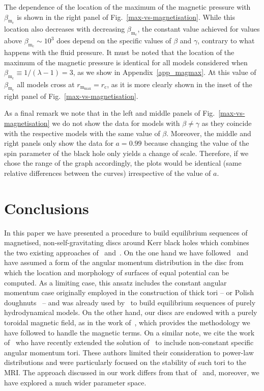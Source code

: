 \documentclass[referee]{aa}
\begin{document}
The dependence of the location of the maximum of the magnetic pressure with $\beta_{\mathrm{m}_{\mathrm{c}}}$ is shown in the right panel of Fig.~\ref{max-vs-magnetisation}. While this location also decreases with decreasing $\beta_{\mathrm{m}_{\mathrm{c}}}$, the constant value achieved for values above $\beta_{\mathrm{m}_{\mathrm{c}}}\sim 10^{3}$ does depend on the specific values of $\beta$ and $\gamma$, contrary to what happens with the fluid pressure. It must be noted that the location of the maximum of the magnetic pressure is identical for all models considered when $\beta_{\mathrm{m}_{\mathrm{c}}} \equiv 1/(\lambda - 1) = 3$, as we show in Appendix~\ref{app_magmax}. At this value of $\beta_{\mathrm{m}_{\mathrm{c}}}$ all models cross at $r_{\mathrm{m}_{\mathrm{max}}} = r_{\mathrm{c}}$, as it is more clearly shown in the inset of the right panel of Fig.~\ref{max-vs-magnetisation}.

As a final remark we note that in the left and middle panels of Fig.~\ref{max-vs-magnetisation} we do not show the data for models with $\beta \neq \gamma$ as they coincide with the respective models with the same value of $\beta$. Moreover, the middle and right panels only show the data for $a=0.99$ because changing the value of the spin parameter of the black hole only yields a change of scale. Therefore, if we chose the range of the graph accordingly, the plots would be identical (same relative differences between the curves) irrespective of the value of $a$.

\section{Conclusions}
\label{conclusions}

In this paper we have presented a procedure to build equilibrium sequences of magnetised, non-self-gravitating discs around Kerr black holes which combines the two existing approaches of~\citet{Komissarov:2006} and~\citet{Qian:2009}. On the one hand we have followed~\citet{Qian:2009} and have assumed a form of the angular momentum distribution in the disc from which the location and morphology of surfaces of equal potential can be computed. As a limiting case, this ansatz includes the constant angular momentum case originally employed in the construction of thick tori -- or Polish doughnuts~\citep{Abramowicz:1978,Kozlowski:1978}  -- and was already used by~\citet{Qian:2009} to build equilibrium sequences of purely hydrodynamical models. On the other hand, our discs are endowed with a purely toroidal magnetic field, as in the work of~\citet{Komissarov:2006}, which provides the methodology we have followed to handle the magnetic terms. On a similar note, we cite the work of~\citet{Wielgus:2015} who have recently extended the solution of~\citet{Komissarov:2006} to include non-constant specific angular momentum tori. These authors limited their consideration to power-law distributions and were particularly focused on the stability of such tori to the MRI. The approach discussed in our work differs from that of~\citet{Wielgus:2015} and, moreover, we have explored a much wider parameter space.
\end{document}
